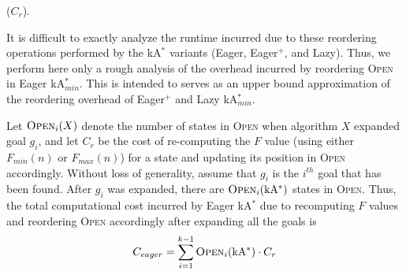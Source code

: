 \documentclass{aicom2e}
\newcommand{\kastar}{kA$^*$}
\newcommand{\kastarmin}{kA$^*_{min}$}
\newcommand{\minf}{$F_{min}(n)$}
\newcommand{\maxf}{$F_{max}(n)$}
\newcommand{\open}{\textsc{Open}}
\begin{document}
\noindent {\bf Reordering of \open{}} ($C_r$).

It is difficult to exactly analyze the runtime incurred due to these reordering
operations performed by the \kastar{} variants (Eager, Eager$^+$, and Lazy).
Thus, we perform here only a rough analysis of the overhead incurred by
reordering \open{} in Eager \kastarmin{}. This is intended to serves as an
upper bound approximation of the reordering overhead of Eager$^+$ and Lazy
\kastarmin{}.


Let $\open{}_i(X)$ denote the number of states in \open{} when algorithm $X$
expanded goal $g_i$, and let $C_r$ be the cost of re-computing the $F$ value
(using either \minf{} or \maxf{}) for a state and updating its position in
\open{} accordingly. Without loss of generality, assume that $g_i$ is the
$i^{th}$ goal that has been found. After $g_i$ was expanded, there are
$\open{}_i(\text{\kastar{}})$ states in \open{}. Thus, the total computational
cost incurred by Eager \kastar{} due to recomputing $F$ values and reordering
\open{} accordingly after expanding  all the goals is
\begin{equation}
C_{eager}=\sum_{i=1}^{k-1} \open{}_i(\text{\kastar{}}) \cdot C_r
\label{eq:re-sort-cost}
\end{equation}
\end{document}
